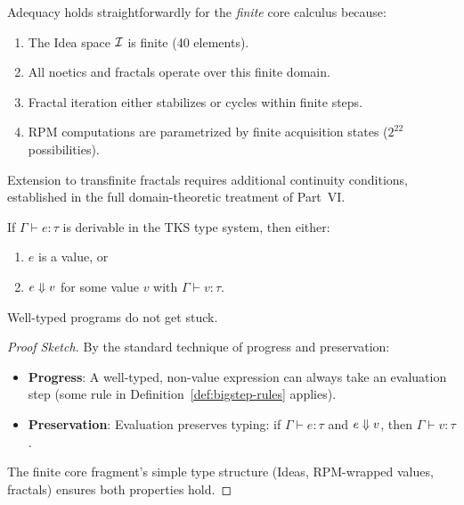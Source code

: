 \begin{remark}
\label{rem:adequacy-finite}
Adequacy holds straightforwardly for the \emph{finite} core calculus because:
\begin{enumerate}[label=(\roman*)]
    \item The Idea space $\mathcal{I}$ is finite (40 elements).
    \item All noetics and fractals operate over this finite domain.
    \item Fractal iteration either stabilizes or cycles within finite steps.
    \item RPM computations are parametrized by finite acquisition states ($2^{22}$ possibilities).
\end{enumerate}
Extension to transfinite fractals requires additional continuity conditions, established
in the full domain-theoretic treatment of Part~VI.
\end{remark}

\begin{theorem}
\label{thm:type-soundness-core}
If $\Gamma \vdash e : \tau$ is derivable in the TKS type system, then either:
\begin{enumerate}[label=(\roman*)]
    \item $e$ is a value, or
    \item $e \Downarrow v$ for some value $v$ with $\Gamma \vdash v : \tau$.
\end{enumerate}
Well-typed programs do not get stuck.
\end{theorem}

\begin{proof}[Proof Sketch]
By the standard technique of progress and preservation:
\begin{itemize}
    \item \textbf{Progress}: A well-typed, non-value expression can always take an
          evaluation step (some rule in Definition~\ref{def:bigstep-rules} applies).
    \item \textbf{Preservation}: Evaluation preserves typing: if $\Gamma \vdash e : \tau$
          and $e \Downarrow v$, then $\Gamma \vdash v : \tau$.
\end{itemize}
The finite core fragment's simple type structure (Ideas, RPM-wrapped values, fractals)
ensures both properties hold.
\end{proof}


